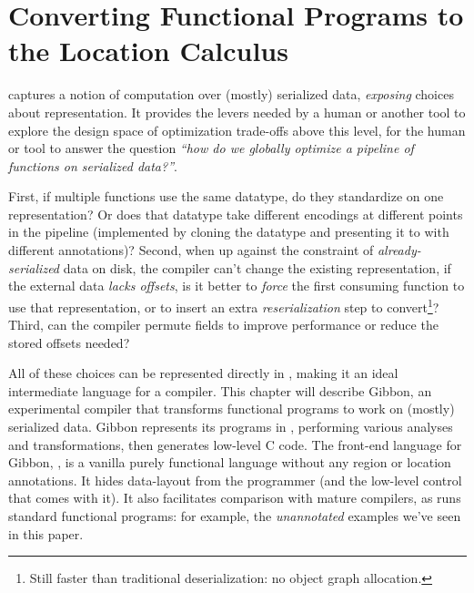 \section{Converting Functional Programs to the Location Calculus}\label{sec:infer-local}

\ourcalc captures a notion of computation over (mostly) serialized data,
\emph{exposing} choices about representation. It provides the levers needed by a human
or another tool to explore the design space of optimization trade-offs above
this level, \ie{} for the human or tool to answer the question
\emph{``how do we globally optimize a pipeline of functions on serialized data?''}.

   First, if multiple functions use the same datatype, do they standardize on one
    representation?  Or does that datatype take different encodings at different
    points in the pipeline (implemented by cloning the datatype and
    presenting it to \ourcalc with different annotations)?
%
    Second, when up against the constraint of {\em already-serialized} data on
    disk, the compiler can't change the existing representation, if the
    external data \emph{lacks offsets}, is it better to \emph{force}
    the first consuming function to use that representation, or to insert an
    extra {\em reserialization} step to convert\footnote{Still faster
    than traditional deserialization: no object graph allocation.}?
%
    Third, can the compiler permute fields to improve performance or reduce the
    stored offsets needed?


    All of these choices can be represented directly in \ourcalc, making it an
    ideal intermediate language for a compiler. This chapter will describe Gibbon,
    an experimental compiler that transforms functional programs to work on
    (mostly) serialized data. Gibbon represents its programs in \ourcalc,
    performing various analyses and transformations, then generates low-level C code.
%
The front-end language for Gibbon, \lamadt, is a vanilla purely functional
language without any region or location
annotations.  It hides data-layout from the programmer (and the low-level
control that comes with it).  It also facilitates comparison with
mature compilers, as \lamadt runs standard functional programs:
for example, the {\em unannotated} examples we've seen in this paper.


